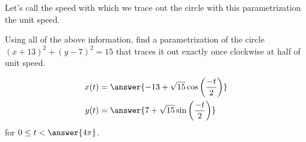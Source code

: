 \documentclass{ximera}
\begin{document}
\begin{exercise}
\begin{exercise}
Let's call the speed with which we trace out the circle with this parametrization the unit speed. 




Using all of the above information, find a parametrization of the circle $(x+13)^2+(y-7)^2=15$ that traces it out exactly once clockwise at half of unit speed. 

\begin{align*}
x(t)&=\answer{ -13+\sqrt{15}\cos\left(\frac{-t}{2}\right) }\\
y(t)&=\answer{ 7+\sqrt{15}\sin\left( \frac{-t}{2} \right) }
\end{align*}
for $0 \leq t < \answer{ 4 \pi    }$.


\end{exercise}
\end{exercise}
\end{document}
